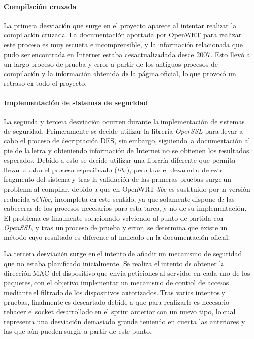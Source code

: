 \documentclass[12pt, twoside]{article}
\begin{document}
        \paragraph{ Compilación cruzada}
        La primera desviación que surge en el proyecto aparece al intentar realizar la compilación cruzada. La documentación aportada por OpenWRT para realizar este proceso es muy escueta e incomprensible, y la información relacionada que pudo ser encontrada en Internet estaba desactualizadada desde 2007. Esto llevó a un largo proceso de prueba y error a partir de los antiguos procesos de compilación y la información obtenida de la página oficial, lo que provocó un retraso en todo el proyecto.

        \paragraph{ Implementación de sistemas de seguridad}
        La segunda y tercera desviación ocurren durante la implementación de sistemas de seguridad. Primeramente se decide utilizar la librería \textit{OpenSSL} para llevar a cabo el proceso de decriptación DES, sin embargo, siguiendo la documentación al pie de la letra y obteniendo información de Internet no se obtienen los resultados esperados. Debido a esto se decide utilizar una librería diferente que permita llevar a cabo el proceso especificado (\textit{libc}), pero tras el desarrollo de este fragmento del sistema y tras la validación de las primeras pruebas surge un problema al compilar, debido a que en OpenWRT \textit{libc} es sustituido por la versión reducida \textit{uClibc}, incompleta en este sentido, ya que solamente dispone de las cabeceras de los procesos necesarios para esta tarea, y no de su implementación. El problema es finalmente solucionado volviendo al punto de partida con \textit{OpenSSL}, y tras un proceso de prueba y error, se determina que existe un método cuyo resultado es diferente al indicado en la documentación oficial.

        La tercera desviación surge en el intento de añadir un mecanismo de seguridad que no estaba planificado inicialmente. Se realiza el intento de obtener la dirección MAC del dispositivo que envía peticiones al servidor en cada uno de los paquetes, con el objetivo implementar un mecanismo de control de accesos mediante el filtrado de los dispositivos autorizados. Tras varios intentos y pruebas, finalmente es descartado debido a que para realizarlo es necesario rehacer el socket desarrollado en el sprint anterior con un nuevo tipo, lo cual representa una desviación demasiado grande teniendo en cuenta las anteriores y las que aún pueden surgir a partir de este punto.
\end{document}
